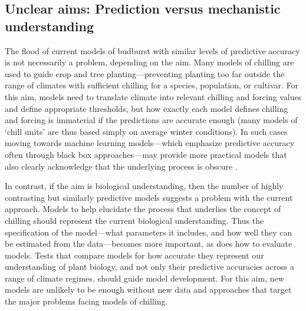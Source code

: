\documentclass[11pt]{article}
\begin{document}
\subsection*{Unclear aims: Prediction versus mechanistic understanding}

The flood of current models of budburst with similar levels of predictive accuracy is not necessarily a problem, depending on the aim. Many models of chilling are used to guide crop and tree planting---preventing planting too far outside the range of climates with sufficient chilling for a species, population, or cultivar. For this aim, models need to translate climate into relevant chilling and forcing values and define appropriate thresholds, but how exactly each model defines chilling and forcing is immaterial if the predictions are accurate enough (many models of `chill units' are thus based simply on average winter conditions). In such cases moving towards machine learning models---which emphasize predictive accuracy often through black box approaches---may provide more practical models that also clearly acknowledge that the underlying process is obscure \citep{khodadadzadeh,bauer2026rethinking}. 

In contrast, if the aim is biological understanding, then the number of highly contrasting but similarly predictive models suggests a problem with the current approach. Models to help elucidate the process that underlies the concept of chilling should represent the current biological understanding. Thus the specification of the model---what parameters it includes, and how well they can be estimated from the data---becomes more important, as does how to evaluate models. Tests that compare models for how accurate they represent our understanding of plant biology, and not only their predictive accuracies across a range of climate regimes, should guide model development. For this aim, new models are unlikely to be enough without new data and approaches that target the major problems facing models of chilling. %
\end{document}
